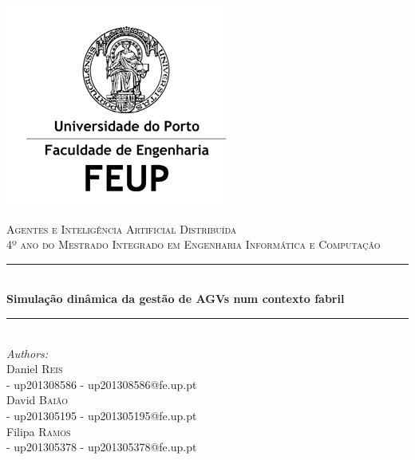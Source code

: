 \begin{titlepage}

\newcommand{\HRule}{\rule{\linewidth}{1mm}} %

\center %
 

\includegraphics{feup.jpg}

\textsc{\large Agentes e Inteligência Artificial Distribuída}\\[0.8cm] %
\textsc{\large 4º ano do Mestrado Integrado em Engenharia Informática e Computação}\\[0.8cm] %


\HRule \\[1.2cm]
{ \huge \bfseries Simulação dinâmica da gestão de AGVs num contexto fabril}\\[0.6cm] %
\HRule \\[3cm]
 


\Large \emph{Authors:}\\[0.5cm] \normalsize
Daniel \textsc{Reis}\\[0.1cm] - up201308586 
- up201308586@fe.up.pt\\[0.1cm]
David \textsc{Baião}\\[0.1cm] - up201305195
- up201305195@fe.up.pt\\[0.1cm] 
Filipa \textsc{Ramos}\\[0.1cm] - up201305378
- up201305378@fe.up.pt\\[3cm] %


\end{titlepage}
